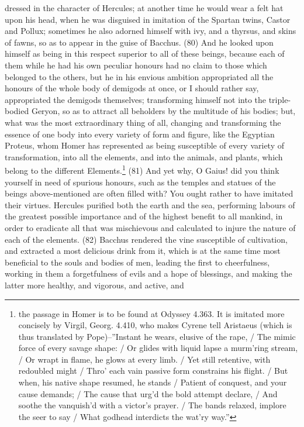dressed in the character of Hercules; at another time he would wear a felt hat upon his head, when
he was disguised in imitation of the Spartan twins, Castor and Pollux; sometimes he also adorned
himself with ivy, and a thyrsus, and skins of fawns, so as to appear in the guise of Bacchus. (80)
And he looked upon himself as being in this respect superior to all of these beings, because each
of them while he had his own peculiar honours had no claim to those which belonged to the others,
but he in his envious ambition appropriated all the honours of the whole body of demigods at once,
or I should rather say, appropriated the demigods themselves; transforming himself not into the
triple-bodied Geryon, so as to attract all beholders by the multitude of his bodies; but, what was the
most extraordinary thing of all, changing and transforming the essence of one body into every
variety of form and figure, like the Egyptian Proteus, whom Homer has represented as being
susceptible of every variety of transformation, into all the elements, and into the animals, and
plants, which belong to the different Elements.\footnote{the passage in Homer is to be found at Odyssey 4.363. It is
imitated more concisely by Virgil, Georg. 4.410, who makes Cyrene tell Aristaeus (which is thus translated by
Pope)--''Instant he wears, elusive of the rape, / The mimic force of every savage shape: / Or glides with liquid lapse a
murm'ring stream, / Or wrapt in flame, he glows at every limb. / Yet still retentive, with redoubled might / Thro' each vain
passive form constrains his flight. / But when, his native shape resumed, he stands / Patient of conquest, and your cause
demands; / The cause that urg'd the bold attempt declare, / And soothe the vanquish'd with a victor's prayer. / The bands
relaxed, implore the seer to say / What godhead interdicts the wat'ry way.''} (81) And yet why, O Gaius! did you
think yourself in need of spurious honours, such as the temples and statues of the beings
above-mentioned are often filled with? You ought rather to have imitated their virtues. Hercules
purified both the earth and the sea, performing labours of the greatest possible importance and of
the highest benefit to all mankind, in order to eradicate all that was mischievous and calculated to
injure the nature of each of the elements. (82) Bacchus rendered the vine susceptible of
cultivation, and extracted a most delicious drink from it, which is at the same time most beneficial to
the souls and bodies of men, leading the first to cheerfulness, working in them a forgetfulness of
evils and a hope of blessings, and making the latter more healthy, and vigorous, and active, and
